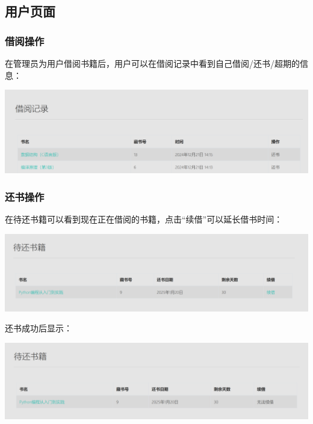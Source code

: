 \documentclass[a4paper,14pt]{article}
\begin{document}
 




\subsection{用户页面}
\subsubsection{借阅操作}
在管理员为用户借阅书籍后，用户可以在借阅记录中看到自己借阅/还书/超期的信息：

\vspace{10pt}
\begin{center}
    \includegraphics[width=0.7\linewidth]{images/1jieyue.png}\end{center}
\vspace{5pt}



\subsubsection{还书操作}
在待还书籍可以看到现在正在借阅的书籍，点击“续借”可以延长借书时间：

\vspace{10pt}
\begin{center}
    \includegraphics[width=0.7\linewidth]{images/1huanshu.png}\end{center}
\vspace{5pt}


还书成功后显示：

\vspace{10pt}
\begin{center}
    \includegraphics[width=0.7\linewidth]{images/2还书.png}\end{center}
\vspace{5pt}
\end{document}
